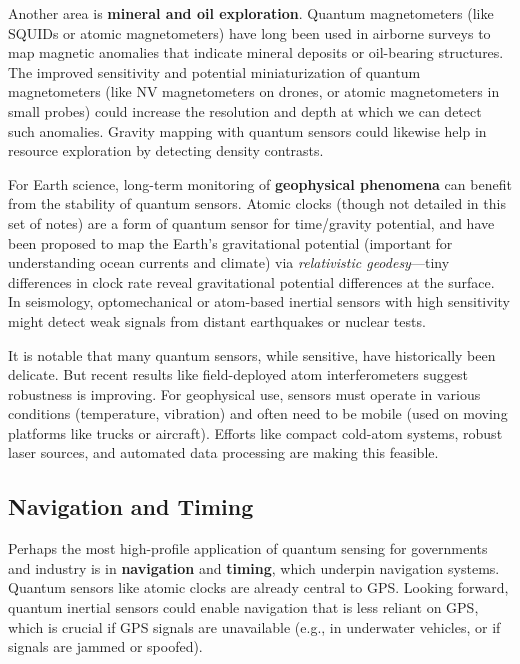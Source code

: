 Another area is \textbf{mineral and oil exploration}. Quantum
magnetometers (like SQUIDs or atomic magnetometers) have long been
used in airborne surveys to map magnetic anomalies that indicate
mineral deposits or oil-bearing structures. The improved sensitivity
and potential miniaturization of quantum magnetometers (like NV
magnetometers on drones, or atomic magnetometers in small probes)
could increase the resolution and depth at which we can detect such
anomalies. Gravity mapping with quantum sensors could likewise help in
resource exploration by detecting density contrasts.



For Earth science, long-term monitoring of \textbf{geophysical
  phenomena} can benefit from the stability of quantum sensors. Atomic
clocks (though not detailed in this set of notes) are a form of
quantum sensor for time/gravity potential, and have been proposed to
map the Earth’s gravitational potential (important for understanding
ocean currents and climate) via \emph{relativistic geodesy}—tiny
differences in clock rate reveal gravitational potential differences
at the surface. In seismology, optomechanical or atom-based inertial
sensors with high sensitivity might detect weak signals from distant
earthquakes or nuclear tests.



It is notable that many quantum sensors, while sensitive, have
historically been delicate. But recent results like field-deployed
atom interferometers suggest robustness is improving. For geophysical
use, sensors must operate in various conditions (temperature,
vibration) and often need to be mobile (used on moving platforms like
trucks or aircraft). Efforts like compact cold-atom systems, robust
laser sources, and automated data processing are making this feasible.



\subsection{Navigation and Timing}

Perhaps the most high-profile application of quantum sensing for
governments and industry is in \textbf{navigation} and
\textbf{timing}, which underpin navigation systems. Quantum sensors
like atomic clocks are already central to GPS. Looking forward,
quantum inertial sensors could enable navigation that is less reliant
on GPS, which is crucial if GPS signals are unavailable (e.g., in
underwater vehicles, or if signals are jammed or spoofed).



